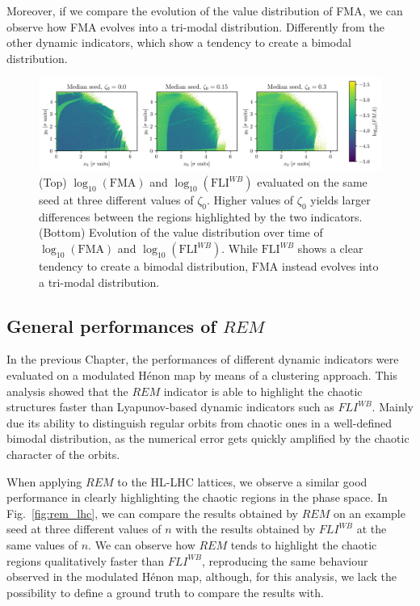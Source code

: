 Moreover, if we compare the evolution of the value distribution of FMA, we can observe how FMA evolves into a tri-modal distribution. Differently from the other dynamic indicators, which show a tendency to create a bimodal distribution.

\begin{figure}[ht]
    \centering
    \includegraphics[width=1.0\textwidth]{6_lhc_dynamic_indicators/figs/FMA.png}
    \caption{(Top) $\log_{10}(\mathrm{FMA})$ and $\log_{10}(\mathrm{FLI}^{WB})$ evaluated on the same seed at three different values of $\zeta_0$. Higher values of $\zeta_0$ yields larger differences between the regions highlighted by the two indicators. (Bottom) Evolution of the value distribution over time of $\log_{10}(\mathrm{FMA})$ and $\log_{10}(\mathrm{FLI}^{WB})$. While $\mathrm{FLI}^{WB}$ shows a clear tendency to create a bimodal distribution, $\mathrm{FMA}$ instead evolves into a tri-modal distribution.}
    \label{fig:fma_vs_fli}
\end{figure}

\subsection{General performances of $REM$}

In the previous Chapter, the performances of different dynamic indicators were evaluated on a modulated Hénon map by means of a clustering approach. This analysis showed that the $REM$ indicator is able to highlight the chaotic structures faster than Lyapunov-based dynamic indicators such as $FLI^{WB}$. Mainly due its ability to distinguish regular orbits from chaotic ones in a well-defined bimodal distribution, as the numerical error gets quickly amplified by the chaotic character of the orbits.

When applying $REM$ to the HL-LHC lattices, we observe a similar good performance in clearly highlighting the chaotic regions in the phase space. In Fig.~\ref{fig:rem_lhc}, we can compare the results obtained by $REM$ on an example seed at three different values of $n$ with the results obtained by $FLI^{WB}$ at the same values of $n$. We can observe how $REM$ tends to highlight the chaotic regions qualitatively faster than $FLI^{WB}$, reproducing the same behaviour observed in the modulated Hénon map, although, for this analysis, we lack the possibility to define a ground truth to compare the results with. 


